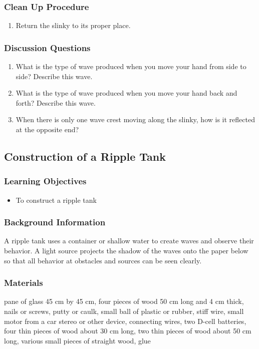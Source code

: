 \subsubsection*{Clean Up Procedure}
\begin{enumerate}
\item{Return the slinky to its proper place.} 
\end{enumerate}

\subsubsection*{Discussion Questions}
\begin{enumerate}
\item{What is the type of wave produced when you move your hand from side to side? Describe this wave.} 
\item{What is the type of wave produced when you move your hand back and forth? Describe this wave.} 
\item{When there is only one wave crest moving along the slinky, how is it reflected at the opposite end?}
\end{enumerate}


\subsection{Construction of a Ripple Tank}

\subsubsection*{Learning Objectives}
\begin{itemize}
\item{To construct a ripple tank} 
\end{itemize}

\subsubsection*{Background Information}
A ripple tank uses a container or shallow water to create waves and observe their behavior. A light source projects the shadow of the waves onto the paper below so that all behavior at obstacles and sources can be seen clearly.

\subsubsection*{Materials}
pane of glass 45 cm by 45 cm, four pieces of wood 50 cm long and 4 cm thick, nails or screws, putty or caulk, small ball of plastic or rubber, stiff wire, small motor from a car stereo or other device, connecting wires, two D-cell batteries, four thin pieces of wood about 30 cm long, two thin pieces of wood about 50 cm long, various small pieces of straight wood, glue


